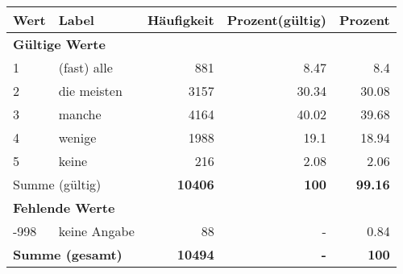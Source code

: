      \begin{longtable}{lXrrr}
     \toprule
     \textbf{Wert} & \textbf{Label} & \textbf{Häufigkeit} & \textbf{Prozent(gültig)} & \textbf{Prozent} \\
     \endhead
     \midrule
     \multicolumn{5}{l}{\textbf{Gültige Werte}}\\

     1 &
     \multicolumn{1}{X}{ (fast) alle   } &


       \num{881} &
       \num[round-mode=places,round-precision=2]{8.47} &
         \num[round-mode=places,round-precision=2]{8.4} \\

     2 &
     \multicolumn{1}{X}{ die meisten   } &


       \num{3157} &
       \num[round-mode=places,round-precision=2]{30.34} &
         \num[round-mode=places,round-precision=2]{30.08} \\

     3 &
     \multicolumn{1}{X}{ manche   } &


       \num{4164} &
       \num[round-mode=places,round-precision=2]{40.02} &
         \num[round-mode=places,round-precision=2]{39.68} \\

     4 &
     \multicolumn{1}{X}{ wenige   } &


       \num{1988} &
       \num[round-mode=places,round-precision=2]{19.1} &
         \num[round-mode=places,round-precision=2]{18.94} \\

     5 &
     \multicolumn{1}{X}{ keine   } &


       \num{216} &
       \num[round-mode=places,round-precision=2]{2.08} &
         \num[round-mode=places,round-precision=2]{2.06} \\
     \midrule
     \multicolumn{2}{l}{Summe (gültig)} &
       \textbf{\num{10406}} &
     \textbf{\num{100}} &
       \textbf{\num[round-mode=places,round-precision=2]{99.16}} \\
     \multicolumn{5}{l}{\textbf{Fehlende Werte}}\\
       -998 &
       keine Angabe &
         \num{88} &
        - &
         \num[round-mode=places,round-precision=2]{0.84} \\
     \midrule
     \multicolumn{2}{l}{\textbf{Summe (gesamt)}} &
          \textbf{\num{10494}} &
        \textbf{-} &
        \textbf{\num{100}} \\
     \bottomrule
     \end{longtable}
     
